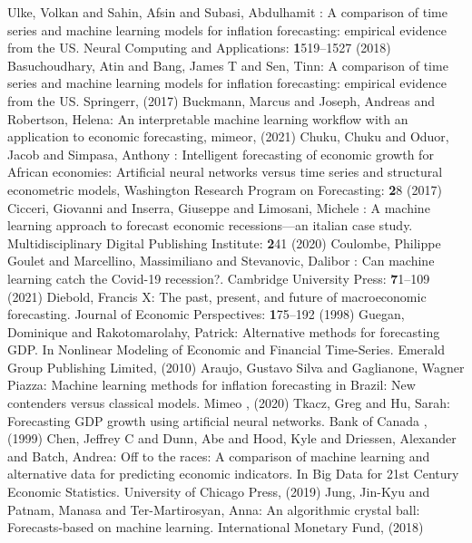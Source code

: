 \documentclass[12pt,italian, twoside]{report}
\begin{document}
%
%
\begin{thebibliography}{8}
Ulke, Volkan and Sahin, Afsin and Subasi, Abdulhamit : A comparison of time series and machine learning models for inflation forecasting: empirical evidence from the US.  Neural Computing and Applications: \textbf1519--1527  (2018)
 Basuchoudhary, Atin and Bang, James T and Sen, Tinn: A comparison of time series and machine learning models for inflation forecasting: empirical evidence from the US. Springerr, (2017)
 Buckmann, Marcus and Joseph, Andreas and Robertson, Helena: An interpretable machine learning workflow with an application to economic forecasting, mimeor,  (2021)
	Chuku, Chuku and Oduor, Jacob and Simpasa, Anthony : Intelligent forecasting of economic growth for African economies: Artificial neural networks versus time series and structural econometric models, Washington Research Program on Forecasting: \textbf28  (2017)
	Cicceri, Giovanni and Inserra, Giuseppe and Limosani, Michele : A machine learning approach to forecast economic recessions—an italian case study.  Multidisciplinary Digital Publishing Institute: \textbf241  (2020)
	Coulombe, Philippe Goulet and Marcellino, Massimiliano and Stevanovic, Dalibor : Can machine learning catch the Covid-19 recession?.  Cambridge University Press: \textbf71--109  (2021)
	Diebold, Francis X: The past, present, and future of macroeconomic forecasting.  Journal of Economic Perspectives: \textbf175--192 (1998)
	Guegan, Dominique and Rakotomarolahy, Patrick: Alternative methods for forecasting GDP. In Nonlinear Modeling of Economic and Financial Time-Series. Emerald Group Publishing Limited, (2010)
	Araujo, Gustavo Silva and Gaglianone, Wagner Piazza: Machine learning methods for inflation forecasting in Brazil: New contenders versus classical models. Mimeo , (2020)
	Tkacz, Greg and Hu, Sarah: Forecasting GDP growth using artificial neural networks. Bank of Canada , (1999)
	Chen, Jeffrey C and Dunn, Abe and Hood, Kyle and Driessen, Alexander and Batch, Andrea: Off to the races: A comparison of machine learning and alternative data for predicting economic indicators. In Big Data for 21st Century Economic Statistics. University of Chicago Press, (2019)
	Jung, Jin-Kyu and Patnam, Manasa and Ter-Martirosyan, Anna: An algorithmic crystal ball: Forecasts-based on machine learning. International Monetary Fund, (2018)

\end{thebibliography}
\end{document}
